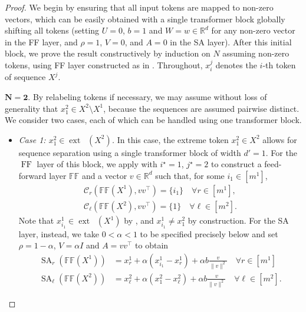 \documentclass[pdflatex,sn-mathphys-num]{sn-jnl}%
\theoremstyle{thmstyleone}%
\theoremstyle{thmstyletwo}%
\theoremstyle{thmstylethree}%
\numberwithin{equation}{section}
\newcommand{\R}{\mathbb{R}}
\DeclareMathOperator{\SA}{\mathrm{SA}}
\DeclareMathOperator{\FF}{\mathrm{FF}}
\DeclareMathOperator{\co}{\overline{co}}
\DeclareMathOperator{\ext}{ext}
\newcommand{\C}{\mathcal{C}}
\begin{document}
\begin{proof}
We begin by ensuring that all input tokens are mapped to non-zero vectors, which can be easily obtained with a single transformer block globally shifting all tokens (setting $U = 0$, $b=1$ and $W = w \in \R^d$ for any non-zero vector in the FF layer, and $\rho = 1$, $V = 0$, and $A=0$ in the SA layer).
After this initial block, we prove the result constructively by induction on $N$ assuming non-zero tokens, using FF layer constructed as in . Throughout, $x_i^j$ denotes the $i$-th token of sequence $X^j$. 

\noindent $\boldsymbol{N = 2}$. By relabeling tokens if necessary, we may assume without loss of generality that $x_1^2 \in X^2 \setminus X^1$, because the sequences are assumed pairwise distinct. We consider two cases, each of which can be handled using one transformer block.
\begin{itemize}%
    \item \textit{Case 1: $x_1^2 \in \ext\co (X^2)$.}
    In this case, the extreme token $x_1^2 \in X^2$ allows for sequence separation using a single transformer block of width $d'=1$. For the $\FF$ layer of this block, we apply  with $i^\star = 1$, $j^\star = 2$ to construct a feed-forward layer $\mathbb{FF}$ and a vector $v\in \R^d$ such that, for some $i_1 \in [m^1]$,
    \begin{subequations}\label{eq:lemSeparation}
        \begin{align}
        \C_r (\mathbb{FF} (X^1), v v^\top) = \{ i_1 \} \quad \forall r \in [m^1], \\
        \C_{\ell} (\mathbb{FF} (X^2), v v^\top) = \{ 1 \} \quad \forall \ell \in [m^2].
    \end{align}
    \end{subequations}
    Note that $x_{i_1}^1\in \ext \co (X^1)$ by , and $x_{i_1}^1\neq x_1^2$ by construction. For the SA layer, instead, we take $0 < \alpha < 1$ to be specified precisely below and set $\rho = 1 -\alpha$, $V = \alpha I$ and $A=v v^\top$ to obtain
    \begin{align*}
        \SA_{r}(\mathbb{FF} (X^1)) &= {x}_r^1 + \alpha ({x}_{i_1}^1 - {x}_r^1) + \alpha b \frac{v}{\| v \|^2} \quad \forall r \in [m^1] \\
        \SA_{\ell}(\mathbb{FF} (X^2)) &=  {x}_{\ell}^2 + \alpha ({x}_1^2 -{x}_{\ell}^2)  + \alpha b \frac{v}{\| v \|^2} \quad \forall \ell \in [m^2].
    \end{align*}

\end{itemize}
\end{proof}
\end{document}

